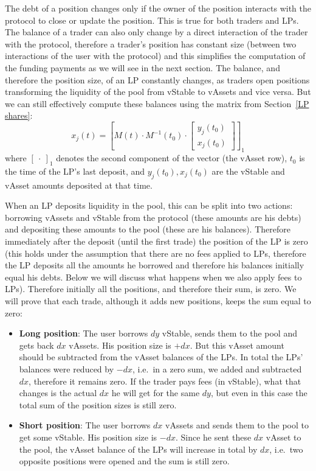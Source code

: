 \documentclass{article}
\begin{document}
The debt of a position changes only if the owner of the position interacts with the
protocol to close or update the position. This is true for both traders and LPs. The
balance of a trader can also only change by a direct interaction of the trader with the
protocol, therefore a trader's position has constant size (between two interactions of the
user with the protocol) and this simplifies the computation of the funding payments as we
will see in the next section. The balance, and therefore the position size, of an LP
constantly changes, as traders open positions transforming the liquidity of the pool from
vStable to vAssets and vice versa. But we can still effectively compute these balances
using the matrix from Section~\ref{LP shares}:
\begin{equation}
x_j(t) = \left[ M(t) \cdot M^{-1}(t_0) \cdot \begin{bmatrix} y_j(t_0) \\ x_j(t_0) \end{bmatrix} \right]_1
\end{equation}
where $[\ \cdot\ ]_1$ denotes the second component of the vector (the vAsset row), $t_0$
is the time of the LP's last deposit, and $y_j(t_0), x_j(t_0)$ are the vStable and vAsset
amounts deposited at that time.

When an LP deposits liquidity in the pool, this can be split into two actions: borrowing
vAssets and vStable from the protocol (these amounts are his debts) and depositing these
amounts to the pool (these are his balances). Therefore immediately after the deposit
(until the first trade) the position of the LP is zero (this holds under the assumption
that there are no fees applied to LPs, therefore the LP deposits all the amounts he
borrowed and therefore his balances initially equal his debts. Below we will discuss what
happens when we also apply fees to LPs). Therefore initially all the positions, and
therefore their sum, is zero. We will prove that each trade, although it adds new
positions, keeps the sum equal to zero:

\begin{itemize}

\item \textbf{Long position}: The user borrows $dy$ vStable, sends them to the pool and
      gets back $dx$ vAssets. His position size is $+dx$. But this vAsset amount should be
      subtracted from the vAsset balances of the LPs. In total the LPs' balances were
      reduced by $-dx$, i.e.\ in a zero sum, we added and subtracted $dx$, therefore it
      remains zero. If the trader pays fees (in vStable), what that changes is the actual
      $dx$ he will get for the same $dy$, but even in this case the total sum of the
      position sizes is still zero.

\item \textbf{Short position}: The user borrows $dx$ vAssets and sends them to the pool
      to get some vStable. His position size is $-dx$. Since he sent these $dx$ vAsset to
      the pool, the vAsset balance of the LPs will increase in total by $dx$, i.e.\ two
      opposite positions were opened and the sum is still zero.

\end{itemize}
\end{document}
